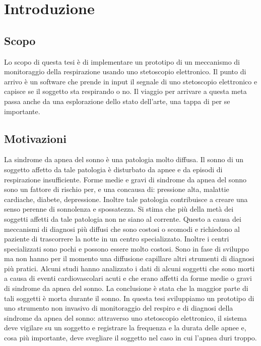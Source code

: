 \chapter{Introduzione}

\section{Scopo}

Lo scopo di questa tesi \`e di implementare un prototipo di un meccanismo di monitoraggio della respirazione usando uno stetoscopio elettronico. 
Il punto di arrivo \`e un software che prende in input il segnale di uno stetoscopio elettronico e capisce se il soggetto sta respirando o no.
Il viaggio per arrivare a questa meta passa anche da una esplorazione dello stato dell'arte, una tappa di per se importante.



\section{Motivazioni}

La sindrome da apnea del sonno \`e una patologia molto diffusa. 
Il sonno di un soggetto affetto da tale patologia \`e disturbato da apnee e da episodi di respirazione insufficiente. 
Forme medie e gravi di sindrome da apnea del sonno sono un fattore di rischio per, e una concausa di: pressione alta, malattie cardiache, diabete, depressione. 
Inoltre tale patologia contribuisce a creare una senso perenne di sonnolenza e spossatezza. 
Si stima che pi\`u della met\`a dei soggetti affetti da tale patologia non ne siano al corrente\cite{intrrr}. 
Questo a causa dei meccanismi di diagnosi pi\`u diffusi che sono costosi o scomodi e richiedono al paziente di trascorrere la notte in un centro specializzato.
Inoltre i centri specializzati sono pochi e possono essere molto costosi. 
Sono in fase di sviluppo ma non hanno per il momento una diffusione capillare altri strumenti di diagnosi pi\`u pratici. 
Alcuni studi hanno analizzato i dati di alcuni soggetti che sono morti a causa di eventi cardiovascolari acuti e che erano 
affetti da forme medie o gravi di sindrome da apnea del sonno. 
La conclusione \`e stata che la maggior parte di tali soggetti \`e morta durante il sonno. 
In questa tesi sviluppiamo un prototipo di uno strumento non invasivo di monitoraggio del respiro e di diagnosi della sindrome da apnea del sonno: attraverso uno stetoscopio elettronico, il sistema deve vigilare su un soggetto e registrare la frequenza e la durata delle apnee e, cosa pi\`u importante, deve svegliare il soggetto nel caso in cui l'apnea duri troppo. 




